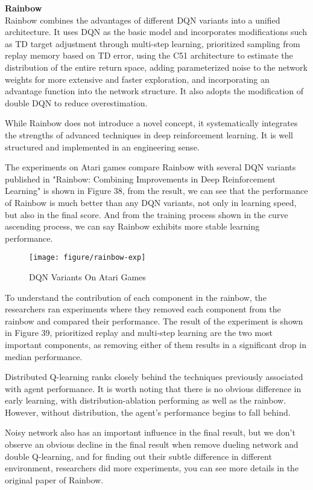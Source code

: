 \documentclass{article}
\begin{document}
\noindent
\textbf{Rainbow}\\
\noindent
Rainbow combines the advantages of different DQN variants into a unified architecture. It uses DQN as the basic model and incorporates modifications such as TD target adjustment through multi-step learning, prioritized sampling from replay memory based on TD error, using the C51 architecture to estimate the distribution of the entire return space, adding parameterized noise to the network weights for more extensive and faster exploration, and incorporating an advantage function into the network structure. It also adopts the modification of double DQN to reduce overestimation.

While Rainbow does not introduce a novel concept, it systematically integrates the strengths of advanced techniques in deep reinforcement learning. It is well structured and implemented in an engineering sense.

The experiments on Atari games compare Rainbow with several DQN variants published in "Rainbow: Combining Improvements in Deep Reinforcement Learning" is shown in Figure 38, from the result, we can see that the performance of Rainbow is much better than any DQN variants, not only in learning speed, but also in the final score. And from the training process shown in the curve ascending process, we can say Rainbow exhibits more stable learning performance.


\begin{figure}[htbp]
        \centering
        \texttt{[image: figure/rainbow-exp]}
        \caption{DQN Variants On Atari Games}
     \end{figure}
    
To understand the contribution of each component in the rainbow, the researchers ran experiments where they removed each component from the rainbow and compared their performance. The result of the experiment is shown in Figure 39, prioritized replay and multi-step learning are the two most important components, as removing either of them results in a significant drop in median performance. 

Distributed Q-learning ranks closely behind the techniques previously associated with agent performance. It is worth noting that there is no obvious difference in early learning, with distribution-ablation performing as well as the rainbow. However, without distribution, the agent's performance begins to fall behind.

Noisy network also has an important influence in the final result, but we don't observe an obvious decline in the final result when remove dueling network and double Q-learning, and for finding out their subtle difference in different environment, researchers did more experiments, you can see more details in the original paper of Rainbow.
 
\end{document}
